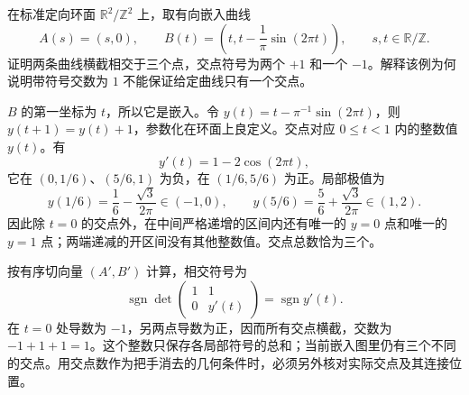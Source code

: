 \begin{exercise}\label{g2:ex:algebraic-one-many-intersections}
	在标准定向环面 \(\mathbb R^2/\mathbb Z^2\) 上，取有向嵌入曲线
	\[
		A(s)=(s,0),\qquad
		B(t)=\left(t,t-\frac1\pi\sin(2\pi t)\right),\qquad s,t\in\mathbb R/\mathbb Z.
	\]
	证明两条曲线横截相交于三个点，交点符号为两个 \(+1\) 和一个 \(-1\)。解释该例为何说明带符号交数为 \(1\) 不能保证给定曲线只有一个交点。
\end{exercise}
\begin{solution}
	\(B\) 的第一坐标为 \(t\)，所以它是嵌入。令 \(y(t)=t-\pi^{-1}\sin(2\pi t)\)，则 \(y(t+1)=y(t)+1\)，参数化在环面上良定义。交点对应 \(0\le t<1\) 内的整数值 \(y(t)\)。有
	\[
		y'(t)=1-2\cos(2\pi t),
	\]
	它在 \((0,1/6)\)、\((5/6,1)\) 为负，在 \((1/6,5/6)\) 为正。局部极值为
	\[
		y(1/6)=\frac16-\frac{\sqrt3}{2\pi}\in(-1,0),\qquad
		y(5/6)=\frac56+\frac{\sqrt3}{2\pi}\in(1,2).
	\]
	因此除 \(t=0\) 的交点外，在中间严格递增的区间内还有唯一的 \(y=0\) 点和唯一的 \(y=1\) 点；两端递减的开区间没有其他整数值。交点总数恰为三个。

	按有序切向量 \((A',B')\) 计算，相交符号为
	\[
		\operatorname{sgn}\det
		\begin{pmatrix}1&1\\0&y'(t)\end{pmatrix}
		=\operatorname{sgn}y'(t).
	\]
	在 \(t=0\) 处导数为 \(-1\)，另两点导数为正，因而所有交点横截，交数为 \(-1+1+1=1\)。这个整数只保存各局部符号的总和；当前嵌入图里仍有三个不同的交点。用交点数作为把手消去的几何条件时，必须另外核对实际交点及其连接位置。
\end{solution}
